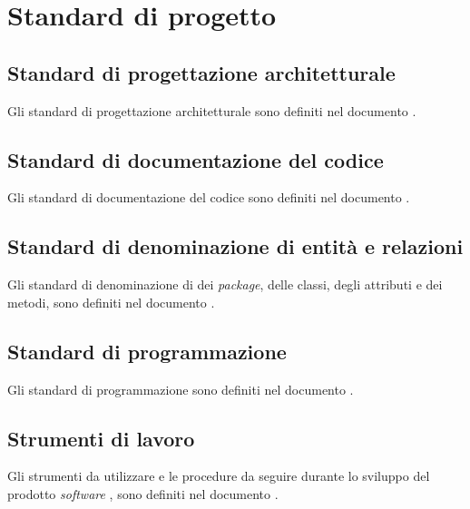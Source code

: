 \section{Standard di progetto}

\subsection{Standard di progettazione architetturale}

Gli standard di progettazione architetturale sono definiti nel documento \SpecificaTecnica{}.

\subsection{Standard di documentazione del codice}

Gli standard di documentazione del codice sono definiti nel documento \NormeDiProgetto{}.

\subsection{Standard di denominazione di entità e relazioni}

Gli standard di denominazione di dei \textit{package}, delle classi, degli attributi e dei metodi, sono definiti nel documento \NormeDiProgetto{}.

\subsection{Standard di programmazione}

Gli standard di programmazione sono definiti nel documento \NormeDiProgetto{}.

\subsection{Strumenti di lavoro}

Gli strumenti da utilizzare e le procedure da seguire durante lo sviluppo del prodotto \textit{software} \progetto{}, sono definiti nel documento \NormeDiProgetto{}.
